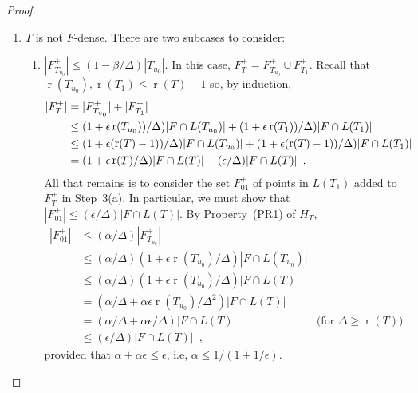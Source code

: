 \documentclass{patmorin}
\DeclareMathOperator{\rank}{r}
\begin{document}
\begin{proof}
\begin{enumerate}
    \item $T$ is not $F$-dense. There are two subcases to consider:
    \begin{enumerate}
       \item $|F^+_{T_{u_0}}| \le (1-\beta/\Delta)|T_{u_0}|$.
         In this case, $F^+_T=F^+_{T_{u_0}}\cup F^+_{T_1}$.
         Recall that
        $\rank(T_{u_0}),\rank(T_1)\le\rank(T)-1$ so, by induction,
         \begin{align}
            |F^+_T| 
              & = |F^+_{T_{u_0}}| + |F^+_{T_{1}}|  \notag \\
              & \le (1+\epsilon\rank(T_{u_0}))/\Delta)|F\cap L(T_{u_0})| 
                    +(1+\epsilon\rank(T_{1}))/\Delta)|F\cap L(T_{1})| \notag \\
              & \le (1+\epsilon(\rank(T)-1))/\Delta)|F\cap L(T_{u_0})| 
                    +(1+\epsilon(\rank(T)-1))/\Delta)|F\cap L(T_{1})|  \notag \\
              & = (1+\epsilon\rank(T)/\Delta)|F\cap L(T)| - (\epsilon/\Delta)|F\cap L(T)| \enspace .
            \eqlabel{inductio}
         \end{align}
         All that remains is to consider the set $F^+_{01}$ of points
         in $L(T_1)$ added to $F^+_T$ in Step~3(a).  In particular,
         we must show that $|F^+_{01}|\le (\epsilon/\Delta)|F\cap L(T)|$. By
         Property~(PR1) of $H_T$,
          \begin{align*}
          |F^+_{01}| 
            & \le (\alpha/\Delta)|F^+_{T_{u_0}}| \\
            & \le (\alpha/\Delta)(1+\epsilon\rank(T_{u_0})/\Delta)|F\cap L(T_{u_0})| \\
            & \le (\alpha/\Delta)(1+\epsilon\rank(T_{u_0})/\Delta)|F\cap L(T)|\\
            & = (\alpha/\Delta+\alpha\epsilon\rank(T_{u_0})/\Delta^2)|F\cap L(T)| \\
            & = (\alpha/\Delta+\alpha\epsilon/\Delta)|F\cap L(T)| 
    	     & \text{(for $\Delta\ge \rank(T)$)} \\
    	& \le (\epsilon/\Delta)|F\cap L(T)| \enspace ,
       \end{align*}
       provided that $\alpha+\alpha\epsilon \le \epsilon$, i.e, 
       $\alpha \le 1/(1+1/\epsilon)$.   


\end{enumerate}
\end{enumerate}
\end{proof}
\end{document}
